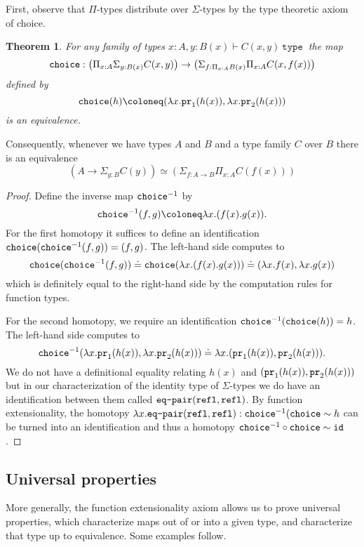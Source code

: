 \documentclass{amsart}
\theoremstyle{theorem}
\newtheorem*{thm}{Theorem}
\theoremstyle{definition}
\theoremstyle{remark}
\newcommand{\0}{\mathbbe{0}}
\newcommand{\1}{\mathbbe{1}}
\newcommand{\2}{\mathbbe{2}}
\newcommand{\3}{\mathbbe{3}}
\newcommand{\4}{\mathbbe{4}}
\newcommand{\univ}{{~\texttt{type}~}}
\newcommand{\term}[1]{{\textup{\texttt{#1}}}}
\newcommand{\id}{\term{id}}
\newcommand{\pr}{\term{pr}}
\newcommand{\refl}{\term{refl}}
\begin{document}
 First, observe that $\Pi$-types distribute over $\Sigma$-types by the type theoretic axiom of choice.

\begin{thm} For any family of types $x :A, y : B(x) \vdash C(x,y) \univ$ the map
\[ \term{choice} : \left(\Pi_{x:A}\Sigma_{y:B(x)}C(x,y) \right) \to \left( \Sigma_{f: \Pi_{x:A}B(x)} \Pi_{x:A} C(x,f(x))\right)\]
defined by 
\[ \term{choice}(h) \coloneq (\lambda x. \pr_1(h(x)), \lambda x.\pr_2(h(x)))\]
is an equivalence.
\end{thm}

Consequently, whenever we have types $A$ and $B$ and a type family $C$ over $B$ there is an equivalence
\[ \left( A \to \Sigma_{y:B}C(y) \right) \simeq \left( \Sigma_{f:A \to B} \Pi_{x:A} C(f(x))\right)\]

\begin{proof}
Define the inverse map $\term{choice}^{-1}$ by
\[ \term{choice}^{-1}(f,g) \coloneq \lambda x.(f(x).g(x)).\]
For the first homotopy it suffices to define an identification $\term{choice}(\term{choice}^{-1}(f,g)) = (f,g)$. The left-hand side computes to
\[ \term{choice}(\term{choice}^{-1}(f,g))  \doteq \term{choice}(\lambda x.(f(x).g(x))) \doteq (\lambda x.f(x),\lambda x.g(x))\]
which is definitely equal to the right-hand side by the computation rules for function types.

For the second homotopy, we require an identification $\term{choice}^{-1}(\term{choice}(h)) = h$. The left-hand side computes to
\[ \term{choice}^{-1} (\lambda x. \pr_1(h(x)), \lambda x.\pr_2(h(x))) \doteq \lambda x.(\pr_1(h(x)), \pr_2(h(x))).\]
We do not have a definitional equality relating $h(x)$ and $(\pr_1(h(x)), \pr_2(h(x)))$ but in our characterization of the identity type of $\Sigma$-types we do have an identification between them called $\term{eq-pair}(\refl,\refl)$. By function extensionality, the homotopy $\lambda x. \term{eq-pair}(\refl,\refl) : \term{choice}^{-1}(\term{choice}\sim h$ can be turned into an identification and thus a homotopy $\term{choice}^{-1} \circ \term{choice} \sim \id$.
\end{proof}

\subsection*{Universal properties}

More generally, the function extensionality axiom allows us to prove universal properties, which characterize maps out of or into a given type, and characterize that type up to equivalence. Some examples follow.
\end{document}
